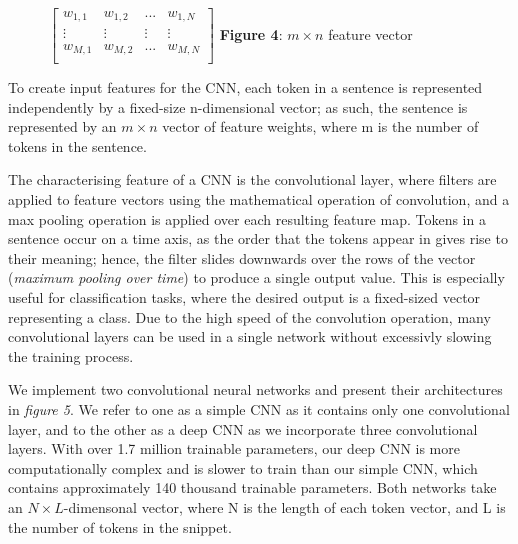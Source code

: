 \documentclass[12pt,a4paper]{article}
\begin{document}
\hspace{-20pt}\begin{minipage}{0.35\textwidth}
	\vspace{-5pt}\begin{figure}[H]
		\begin{center}
			$
			\begin{bmatrix}
			w_{1,1} & w_{1,2} & ... & w_{1,N}\\
			\vdots & \vdots & \vdots & \vdots \\
			w_{M, 1} & w_{M, 2} & ... & w_{M, N} \\
			\end{bmatrix}
			$\vspace{5pt}
			\textbf{Figure 4}: $m \times n$ feature vector\\
		\end{center}
	\end{figure}
\end{minipage} \hfill
\begin{minipage}{0.62\textwidth}
	\vspace{-8pt}
	To create input features for the CNN, each token in a sentence is represented independently by a fixed-size n-dimensional vector; as such, the sentence is represented by an $m \times n$ vector of feature weights, where m is the number of tokens in the sentence.
\end{minipage}\vspace{-5pt}

\noindent The characterising feature of a CNN is the convolutional layer, where filters are applied to feature vectors using the mathematical operation of convolution, and a max pooling operation is applied over each resulting feature map. Tokens in a sentence occur on a time axis, as the order that the tokens appear in gives rise to their meaning; hence, the filter slides downwards over the rows of the vector (\textit{maximum pooling over time}) to produce a single output value. This is especially useful for classification tasks, where the desired output is a fixed-sized vector representing a class. Due to the high speed of the convolution operation, many convolutional layers can be used in a single network without excessivly slowing the training process.

We implement two convolutional neural networks and present their architectures in \textit{figure 5}. We refer to one as a simple CNN as it contains only one convolutional layer, and to the other as a deep CNN as we incorporate three convolutional layers. With over 1.7 million trainable parameters, our deep CNN is more computationally complex and is slower to train than our simple CNN, which contains approximately 140 thousand trainable parameters. Both networks take an $N \times L$-dimensonal vector, where N is the length of each token vector, and L is the number of tokens in the snippet.\vspace{-16pt}
\end{document}
